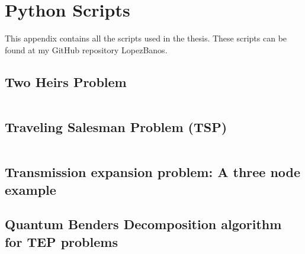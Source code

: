 
\chapter{Python Scripts} %

This appendix contains all the scripts used in the thesis. These scripts can be found at my GitHub repository LopezBanos.
\label{AppendixD} %
\section{Two Heirs Problem}
\inputminted[linenos]{python}{Scripts/Two_Heirs.py}
\section{Traveling Salesman Problem (TSP)}
\inputminted[linenos]{python}{Scripts/tsp_simulated_annealing.py}
\section{Transmission expansion problem: A three node example}
\section{Quantum Benders Decomposition algorithm for TEP problems}